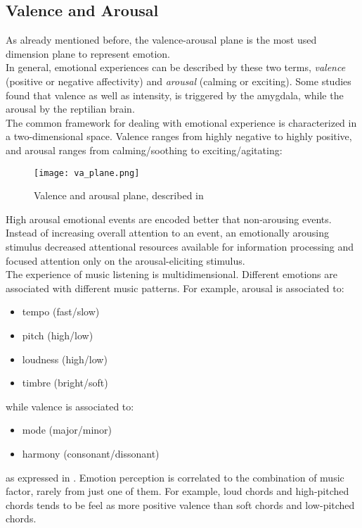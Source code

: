 \subsection{Valence and Arousal}
As already mentioned before, the valence-arousal plane is the most used dimension plane to represent emotion.
\\
In general, emotional experiences can be described by these two terms, \textit{valence} (positive or negative affectivity) and \textit{arousal} (calming or exciting). Some studies found that valence as well as intensity, is triggered by the amygdala, while the arousal by the reptilian brain.
\\
The common framework for dealing with emotional experience is characterized in a two-dimensional space. Valence ranges from highly negative to highly positive, and arousal ranges from calming/soothing to exciting/agitating:
\begin{figure}[h]
    \centering
    \texttt{[image: va\_plane.png]} 
	\caption{Valence and arousal plane, described in \cite{kensinger2004remembering}}
    \label{fig:va_plane}
\end{figure}
High arousal emotional events are encoded better that non-arousing events. Instead of increasing overall attention to an event, an emotionally arousing stimulus decreased attentional resources available for information processing and focused attention only on the arousal-eliciting stimulus.
\\ \indent
The experience of music listening is multidimensional. Different emotions are associated with different music patterns. For example, arousal is associated to:
\begin{itemize}
	\item tempo (fast/slow)
	\item pitch (high/low)
	\item loudness (high/low)
	\item timbre (bright/soft)
\end{itemize}
while valence is associated to:
\begin{itemize}
	\item mode (major/minor)
	\item harmony (consonant/dissonant)
\end{itemize}
as expressed in \cite{gabrielsson2001influence}. Emotion perception is correlated to the combination of music factor, rarely from just one of them. For example, loud chords and high-pitched chords tends to be feel as more positive valence than soft chords and low-pitched chords.

